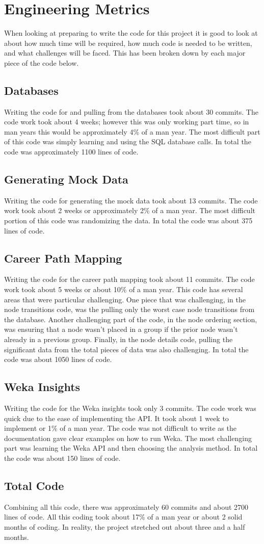 \section{Engineering Metrics}
\label{sect:engineering-metrics}
When looking at preparing to write the code for this project it is good to look
at about how much time will be required, how much code is needed to be written,
and what challenges will be faced.  This has been broken down by each major
piece of the code below.
\subsection{Databases}
Writing the code for and pulling from the databases took about 30 commits.
The code work took about 4 weeks; however this was only working part time, so in
man years this would be approximately 4\% of a man year.  The most difficult
part of this code was simply learning and using the SQL database calls.  In
total the code was approximately 1100 lines of code.
\subsection{Generating Mock Data}
Writing the code for generating the mock data took about 13 commits.  The code
work took about 2 weeks or approximately 2\% of a man year.  The most difficult
portion of this code was randomizing the data.  In total the code was about 375
lines of code.
\subsection{Career Path Mapping}
Writing the code for the career path mapping took about 11 commits.  The code
work took about 5 weeks or about 10\% of a man year.  This code has several
areas that were particular challenging.  One piece that was challenging, in the
node transitions code, was the pulling only the worst case node transitions from
the database.  Another challenging part of the code, in the node ordering
section, was ensuring that a node wasn't placed in a group if the prior node
wasn't already in a previous group.  Finally, in the node details code, pulling
the significant data from the total pieces of data was also challenging.  In
total the code was about 1050 lines of code.
\subsection{Weka Insights}
Writing the code for the Weka insights took only 3 commits.  The code work was
quick due to the ease of implementing the API.  It took about 1 week to
implement or 1\% of a man year.  The code was not difficult to write as the
documentation gave clear examples on how to run Weka.  The most challenging part
was learning the Weka API and then choosing the analysis method.  In total the
code was about 150 lines of code.
\subsection{Total Code}
Combining all this code, there was approximately 60 commits and about 2700 lines
of code.  All this coding took about 17\% of a man year or about 2 solid months
of coding.  In reality, the project stretched out about three and a half months.
